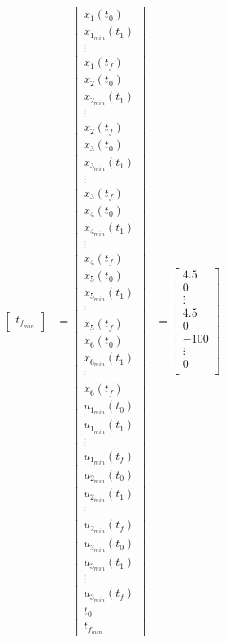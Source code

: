 \documentclass[11pt,usenames]{article}
\begin{document}
\begin{align}
\begin{bmatrix}
	t_{f_{min}}  
	\end{bmatrix}
	&=
	\begin{bmatrix}
	x_{1}(t_{0}) \\ x_{1_{min}}(t_{1}) \\ \vdots \\  x_{1}(t_{f}) \\  
	x_{2}(t_{0}) \\ x_{2_{min}}(t_{1}) \\ \vdots \\  x_{2}(t_{f}) \\ 
	x_{3}(t_{0}) \\ x_{3_{min}}(t_{1}) \\ \vdots \\  x_{3}(t_{f}) \\ 
	x_{4}(t_{0}) \\ x_{4_{min}}(t_{1}) \\ \vdots \\  x_{4}(t_{f}) \\
	x_{5}(t_{0}) \\ x_{5_{min}}(t_{1}) \\ \vdots \\  x_{5}(t_{f}) \\ 
	x_{6}(t_{0}) \\ x_{6_{min}}(t_{1}) \\ \vdots \\  x_{6}(t_{f}) \\ 
	u_{1_{min}}(t_{0}) \\ u_{1_{min}}(t_{1}) \\ \vdots \\  u_{1_{min}}(t_{f}) \\
	u_{2_{min}}(t_{0}) \\ u_{2_{min}}(t_{1}) \\ \vdots \\  u_{2_{min}}(t_{f}) \\ 
	u_{3_{min}}(t_{0}) \\ u_{3_{min}}(t_{1}) \\ \vdots \\  u_{3_{min}}(t_{f}) \\  
	t_{0} \\ 
	t_{f_{min}}  
	\end{bmatrix}
	&=
	\begin{bmatrix}
	4.5 \\ 0 \\ \vdots \\  4.5 \\  
	0 \\ -100 \\ \vdots \\  0 \\ 

\end{bmatrix}
\end{align}
\end{document}
